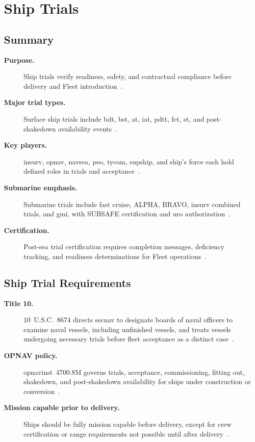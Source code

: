 \documentclass[../main.tex]{subfiles}
\begin{document}
\section{Ship Trials}

\subsection{Summary}
\begin{description}
  \item[\textbf{Purpose.}] Ship trials verify readiness, safety, and contractual compliance before delivery and Fleet introduction~\autocite{edo-3-5-7-ship-trials-2025}.
  \item[\textbf{Major trial types.}] Surface ship trials include \ac{bdt}, \ac{bst}, \ac{at}, \ac{iat}, \ac{pdtt}, \ac{fct}, \ac{st}, and post-shakedown availability events~\autocite{edo-3-5-7-ship-trials-2025}.
  \item[\textbf{Key players.}] \ac{insurv}, \ac{opnav}, \ac{navsea}, \ac{peo}, \ac{tycom}, \ac{supship}, and ship's force each hold defined roles in trials and acceptance~\autocite{edo-3-5-7-ship-trials-2025}.
  \item[\textbf{Submarine emphasis.}] Submarine trials include fast cruise, ALPHA, BRAVO, \ac{insurv} combined trials, and \ac{gmi}, with SUBSAFE certification and \ac{uro} authorization~\autocite{edo-3-5-7-ship-trials-2025}.
  \item[\textbf{Certification.}] Post-sea trial certification requires completion messages, deficiency tracking, and readiness determinations for Fleet operations~\autocite{edo-3-5-7-ship-trials-2025}.
\end{description}

\subsection{Ship Trial Requirements}
\begin{description}
  \item[\textbf{Title 10.}] 10~U.S.C.~8674 directs \ac{secnav} to designate boards of naval officers to examine naval vessels, including unfinished vessels, and treats vessels undergoing necessary trials before fleet acceptance as a distinct case~\autocite{USC-10-8674,edo-3-5-7-ship-trials-2025}.
  \item[\textbf{OPNAV policy.}] \ac{opnavinst}~4700.8M governs trials, acceptance, commissioning, fitting out, shakedown, and post-shakedown availability for ships under construction or conversion~\autocite{OPNAVINST-4700-8M,edo-3-5-7-ship-trials-2025}.
  \item[\textbf{Mission capable prior to delivery.}] Ships should be fully mission capable before delivery, except for crew certification or range requirements not possible until after delivery~\autocite{edo-3-5-7-ship-trials-2025}.
\end{description}
\end{document}
